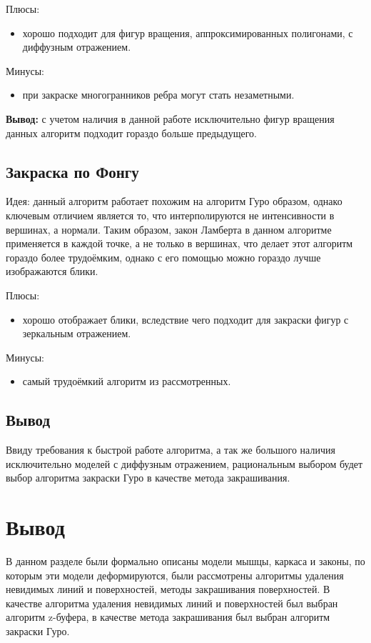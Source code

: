 Плюсы:
\begin{itemize}
    \item хорошо подходит для фигур вращения, аппроксимированных полигонами, с диффузным отражением.
\end{itemize}

Минусы:
\begin{itemize}
    \item при закраске многогранников ребра могут стать незаметными.
\end{itemize}

\textbf{Вывод:} с учетом наличия в данной работе исключительно фигур вращения данных алгоритм подходит гораздо больше предыдущего.


\subsection{Закраска по Фонгу}
Идея: данный алгоритм работает похожим на алгоритм Гуро образом, однако ключевым отличием является то, что интерполируются не интенсивности в вершинах, а нормали. Таким образом, закон Ламберта в данном алгоритме применяется в каждой точке, а не только в вершинах, что делает этот алгоритм гораздо более трудоёмким, однако с его помощью можно гораздо лучше изображаются блики.

Плюсы:
\begin{itemize}
    \item хорошо отображает блики, вследствие чего подходит для закраски фигур с зеркальным отражением.
\end{itemize}

Минусы:
\begin{itemize}
    \item самый трудоёмкий алгоритм из рассмотренных.
\end{itemize}

\subsection*{Вывод}

Ввиду требования к быстрой работе алгоритма, а так же большого наличия исключительно моделей с диффузным отражением, рациональным выбором будет выбор алгоритма закраски Гуро в качестве метода закрашивания.


\section*{Вывод}

В данном разделе были формально описаны модели мышцы, каркаса и законы, по которым эти модели деформируются, были рассмотрены алгоритмы удаления невидимых линий и поверхностей, методы закрашивания поверхностей. В качестве алгоритма удаления невидимых линий и поверхностей был выбран алгоритм z-буфера, в качестве метода закрашивания был выбран алгоритм закраски Гуро.
